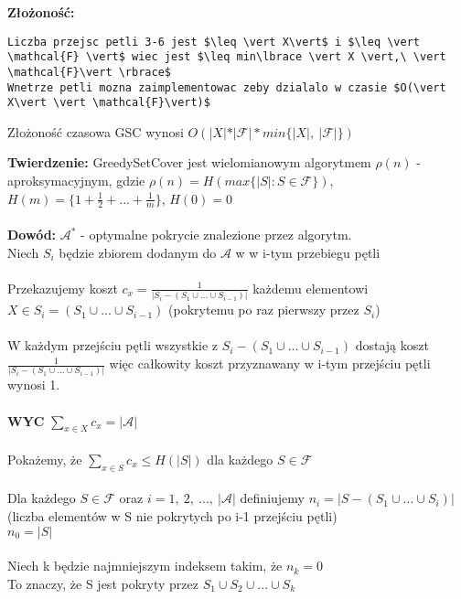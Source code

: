 \textbf{Złożoność: }
\begin{lstlisting}
Liczba przejsc petli 3-6 jest $\leq \vert X\vert$ i $\leq \vert \mathcal{F} \vert$ wiec jest $\leq min\lbrace \vert X \vert,\ \vert \mathcal{F}\vert \rbrace$
Wnetrze petli mozna zaimplementowac zeby dzialalo w czasie $O(\vert X\vert \vert \mathcal{F}\vert)$
\end{lstlisting}
\begin{center}
Złożoność czasowa GSC wynosi $O(\vert X\vert \ast \vert\mathcal{F}\vert \ast min\lbrace \vert X \vert,\ \vert \mathcal{F}\vert \rbrace)$
\end{center}
\textbf{Twierdzenie: }GreedySetCover jest wielomianowym algorytmem $\rho(n)$ - aproksymacyjnym, gdzie $\rho(n) = H(max\lbrace\vert S\vert :S\in \mathcal{F}\rbrace)$, $H(m) = \lbrace 1 + \frac{1}{2} + ... +\frac{1}{m}\rbrace$, $H(0)=0$\\
\\
\textbf{Dowód: }$\mathcal{A}^{\ast}$ - optymalne pokrycie znalezione przez algorytm.\\
\tab Niech $S_i$ będzie zbiorem dodanym do $\mathcal{A}$ w w i-tym przebiegu pętli\\\\
Przekazujemy koszt $c_x=\frac{1}{\vert S_i-(S_1\cup ... \cup S_{i-1})\vert}$ każdemu elementowi $X\in S_i = (S_1 \cup ... \cup S_{i-1})$ (pokrytemu po raz pierwszy przez $S_i$)\\
\\
\tab W każdym przejściu pętli wszystkie z $S_i - (S_1 \cup ... \cup S_{i-1})$ dostają koszt $\frac{1}{\vert S_i-(S_1\cup ... \cup S_{i-1})\vert}$ więc całkowity koszt przyznawany w i-tym przejściu pętli wynosi 1.\\\\
\textbf{WYC} $\sum_{x\in X}c_x=\vert \mathcal{A}\vert$\\
\\
Pokażemy, że $\sum_{x\in S}c_x \leq H(\vert S\vert)$ dla każdego $S\in \mathcal{F}$\\
\\
Dla każdego $S\in \mathcal{F}$ oraz $i=1,\ 2,\ ...,\ \vert\mathcal{A}\vert$ definiujemy $n_i = \vert S - (S_1 \cup ... \cup S_i)\vert$ (liczba elementów w S nie pokrytych po i-1 przejściu pętli)\\
\tab $n_0=\vert S\vert$\\
\\
Niech k będzie najmniejszym indeksem takim, że $n_k=0$\\
\tab To znaczy, że S jest pokryty przez $S_1 \cup S_2 \cup ... \cup S_k$\\
